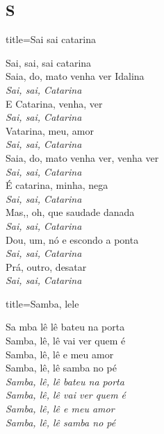 \documentclass[fontsize=14pt, twoside]{scrreprt}
\newcommand\chapTOC[1]{
    \chapter*{#1}
    \addcontentsline{toc}{chapter}{#1}
    \markboth{#1}{#1}}
\begin{document}
\begin{multicols*}{2}
\chapTOC{S}

\begin{song}{title={Sai sai catarina}}
        \begin{verse*}
            Sai, sai, sai catarina\\
            Saia, do, mato venha ver Idalina\\
            \textit{Sai, sai, Catarina}\\
            E Catarina, venha, ver\\
            \textit{Sai, sai, Catarina}\\
            Vatarina, meu, amor\\
            \textit{Sai, sai, Catarina}\\
            Saia, do, mato venha ver, venha ver\\
            \textit{Sai, sai, Catarina}\\
            É catarina, minha, nega\\
            \textit{Sai, sai, Catarina}\\
            Mas,, oh, que saudade danada\\
            \textit{Sai, sai, Catarina}\\
            Dou, um, nó e escondo a ponta\\
            \textit{Sai, sai, Catarina}\\
            Prá, outro, desatar\\
            \textit{Sai, sai, Catarina}\\
        \end{verse*}
\end{song}

\begin{song}{title={Samba, lele}}
        \begin{verse*}
        Sa mba lê lê bateu na porta\\
        Samba, lê, lê vai ver quem é\\
        Samba, lê, lê e meu amor\\
        Samba, lê, lê samba no pé\\
        \textit{Samba, lê, lê bateu na porta}\\
        \textit{Samba, lê, lê vai ver quem é}\\
        \textit{Samba, lê, lê e meu amor}\\
        \textit{Samba, lê, lê samba no pé}\\
    \end{verse*}


\end{song}
\end{multicols*}
\end{document}
